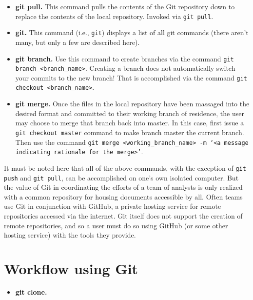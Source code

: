 \documentclass[10pt]{article}
\begin{document}
\begin{itemize}
	\item \textbf{git pull.}  This command pulls the contents of the Git repository down to replace the contents of the local repository.  Invoked via \texttt{git pull}.
	\item \textbf{git.}  This command (i.e., \texttt{git}) displays a list of all git commands (there aren't many, but only a few are described here).
	\item \textbf{git branch.}  Use this command to create branches via the command \texttt{git branch <branch\_name>}.  Creating a branch does not automatically switch your commits to the new branch!  That is accomplished via the
		command \texttt{git checkout <branch\_name>}.
	\item \textbf{git merge.}  Once the files in the local repository have been massaged into the desired format and committed to their working branch of residence, the user may choose to merge that branch back into master.  In this
		case, first issue a \texttt{git checkout master} command to make branch master the current branch.  Then use the command \texttt{git merge <working\_branch\_name> -m `<a message indicating rationale for the merge>'}.
\end{itemize}

It must be noted here that all of the above commands, with the exception of \texttt{git push} and \texttt{git pull}, can be accomplished on one's own isolated computer.  But the value of Git in coordinating the efforts of a team of
analysts is only realized with a common repository for housing documents accessible by all.  Often teams use Git in conjunction with GitHub, a private hosting service for remote repositories accessed via the internet.  Git itself does not support the creation of remote repositories, and so a user must do so using GitHub (or some other hosting service) with the tools they provide.

\section{Workflow using Git}
\begin{itemize}
	\item \textbf{git clone.} 
\end{itemize}
\end{document}
